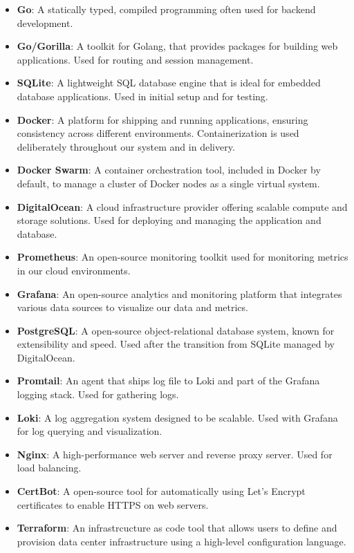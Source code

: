 \begin{multicols}{2}
    \begin{itemize}
        \item \textbf{Go}: A statically typed, compiled programming often used for backend development.
        \item \textbf{Go/Gorilla}: A toolkit for Golang, that provides packages for building web applications. Used for routing and session management.
        \item \textbf{SQLite}: A lightweight SQL database engine that is ideal for embedded database applications. Used in initial setup and for testing.
        \item \textbf{Docker}: A platform for shipping and running applications, ensuring consistency across different environments. Containerization is used deliberately throughout our system and in delivery.
        \item \textbf{Docker Swarm}: A container orchestration tool, included in Docker by default, to manage a cluster of Docker nodes as a single virtual system.
        \item \textbf{DigitalOcean}: A cloud infrastructure provider offering scalable compute and storage solutions. Used for deploying and managing the application and database.
        \item \textbf{Prometheus}: An open-source monitoring toolkit used for monitoring metrics in our cloud environments.
        \item \textbf{Grafana}: An open-source analytics and monitoring platform that integrates various data sources to visualize our data and metrics.
        \item \textbf{PostgreSQL}: A open-source object-relational database system, known for extensibility and speed. Used after the transition from SQLite managed by DigitalOcean.
        \item \textbf{Promtail}: An agent that ships log file to Loki and part of the Grafana logging stack. Used for gathering logs.
        \item \textbf{Loki}: A log aggregation system designed to be scalable. Used with Grafana for log querying and visualization.
        \item \textbf{Nginx}: A high-performance web server and reverse proxy server. Used for load balancing.
        \item \textbf{CertBot}: A open-source tool for automatically using Let's Encrypt certificates to enable HTTPS on web servers.
        \item \textbf{Terraform}: An infrastrcucture as code tool that allows users to define and provision data center infrastructure using a high-level configuration language. 
    \end{itemize}
\end{multicols}

